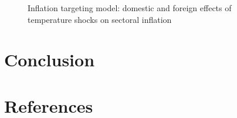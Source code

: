 \documentclass[
  letterpaper,
  DIV=11,
  numbers=noendperiod]{scrartcl}
\begin{document}
\begin{figure}[H]


\caption{\label{fig-inflation_targeting_temp}Inflation targeting model:
domestic and foreign effects of temperature shocks on sectoral
inflation}

\end{figure}%

\section{Conclusion}\label{conclusion}

\newpage

\section*{References}\label{references}

\renewcommand{\bibsection}{}


\setcounter{section}{0}
\renewcommand{\thesection}{\Alph{section}}

\setcounter{table}{0}
\renewcommand{\thetable}{A\arabic{table}}

\setcounter{figure}{0}
\renewcommand{\thefigure}{A\arabic{figure}}
\end{document}
